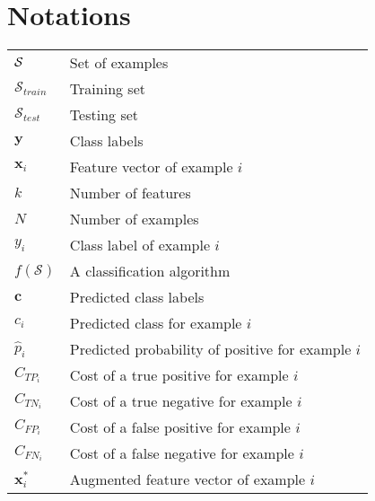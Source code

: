 
\chapter{Notations}
	
\begin{tabularx}{\textwidth}{ l X }
$\cal S$ 		& Set of examples 		\dotfill \pageref{ntn:ch2:1} \\ 
$\mathcal{S}_{train}$ 	& Training set	 		\dotfill \pageref{ntn:ch2:1} \\
$\mathcal{S}_{test}$ 	& Testing set	 		\dotfill \pageref{ntn:ch2:1} \\
$\mathbf{y}$ 		& Class labels 			\dotfill \pageref{ntn:ch2:1} \\  
$\mathbf{x}_i$ 		& Feature vector of example $i$ \dotfill \pageref{ntn:ch2:1} \\
$k$ 			& Number of features 		\dotfill \pageref{ntn:ch2:1} \\
$N $ 			& Number of examples 		\dotfill \pageref{ntn:ch2:1} \\
$y_i$ 			& Class label of example $i$ 	\dotfill \pageref{ntn:ch2:1} \\
$f(\mathcal{S})$ 	& A classification algorithm 	\dotfill \pageref{ntn:ch2:1} \\
$\mathbf{c}$ 		& Predicted class labels 	\dotfill \pageref{ntn:ch2:1} \\  
$c_i$ 			& Predicted class for example $i$  \dotfill \pageref{ntn:ch2:1} \\
$\hat p_i$		& Predicted probability of positive for example $i$ \dotfill \pageref{ntn:ch2:1} \\
$C_{TP_i}$		& Cost of a true positive for example $i$	\dotfill \pageref{ntn:ch2:2} \\
$C_{TN_i}$		& Cost of a true negative for example $i$	\dotfill \pageref{ntn:ch2:2} \\	
$C_{FP_i}$		& Cost of a false positive for example $i$	\dotfill \pageref{ntn:ch2:2} \\	
$C_{FN_i}$		& Cost of a false negative for example $i$	\dotfill \pageref{ntn:ch2:2} \\	
$\mathbf{x}_i^*$ 	& Augmented feature vector of example $i$ \dotfill \pageref{ntn:ch2:3} \\	
\end{tabularx}
